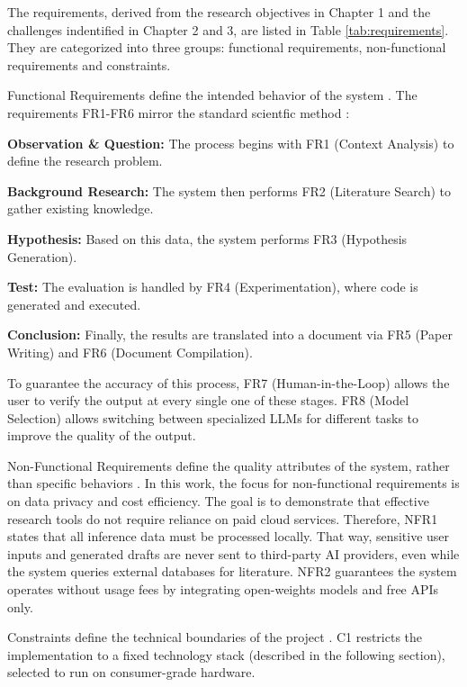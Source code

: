 The requirements, derived from the research objectives in Chapter 1 and the challenges indentified in Chapter 2 and 3, 
are listed in Table \ref{tab:requirements}. They are categorized into three groups: functional requirements, non-functional requirements and constraints.

Functional Requirements define the intended behavior of the system \cite{IEEE830}. 
The requirements FR1-FR6 mirror the standard scientfic method \cite{Popper1959TheLogic}:
\begin{description}
    \item \textbf{Observation \& Question:} The process begins with FR1 (Context Analysis) to define the research problem.
    \item \textbf{Background Research:} The system then performs FR2 (Literature Search) to gather existing knowledge.
    \item \textbf{Hypothesis:} Based on this data, the system performs FR3 (Hypothesis Generation).
    \item \textbf{Test:} The evaluation is handled by FR4 (Experimentation), where code is generated and executed.
    \item \textbf{Conclusion:} Finally, the results are translated into a document via FR5 (Paper Writing) and FR6 (Document Compilation).
\end{description}
To guarantee the accuracy of this process, FR7 (Human-in-the-Loop) allows the user to verify the output at every single one of these stages.
FR8 (Model Selection) allows switching between specialized LLMs for different tasks to improve the quality of the output.

\medskip
Non-Functional Requirements define the quality attributes of the system, rather than specific behaviors \cite{Li2014NonfunctionalRA}. 
In this work, the focus for non-functional requirements is on data privacy and cost efficiency.
The goal is to demonstrate that effective research tools do not require reliance on paid cloud services.
Therefore, NFR1 states that all inference data must be processed locally.
That way, sensitive user inputs and generated drafts are never sent to third-party AI providers, even while the system queries external databases for literature.
NFR2 guarantees the system operates without usage fees by integrating open-weights models and free APIs only.

\medskip
Constraints define the technical boundaries of the project \cite{Meyer2019TheAO}. 
C1 restricts the implementation to a fixed technology stack (described in the following section), selected to run on consumer-grade hardware.


